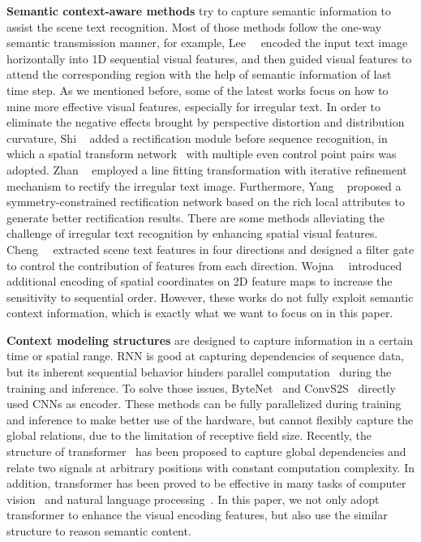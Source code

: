 \documentclass[10pt,twocolumn,letterpaper]{article}
\begin{document}
\begin{CJK}{UTF8}{gbsn}
\textbf{Semantic context-aware methods} try to capture semantic information to assist the scene text recognition. Most of those methods follow the one-way semantic transmission manner, for example, Lee~\etal~\cite{lee2016recursive} encoded the input text image horizontally into 1D sequential visual features, and then guided visual features to attend the corresponding region with the help of semantic information of last time step.
As we mentioned before, some of the latest works focus on how to mine more effective visual features, especially for irregular text. 
In order to eliminate the negative effects brought by perspective distortion and distribution curvature, Shi \etal~\cite{shi2018aster} added a rectification module before sequence recognition, in which a spatial transform network~\cite{jaderberg2015spatial} with multiple even control point pairs was adopted. 
Zhan \etal~\cite{zhan2019esir} employed a line fitting transformation with iterative refinement mechanism to rectify the irregular text image.
Furthermore, Yang \etal~\cite{yang2019symmetry} proposed a symmetry-constrained rectification network based on the rich local attributes to generate better rectification results.
There are some methods alleviating the challenge of irregular text recognition by enhancing spatial visual features. 
Cheng~\etal~\cite{cheng2018aon} extracted scene text features in four directions and designed a filter gate to control the contribution of features from each direction. 
Wojna~\etal~\cite{wojna2017attention-2D} introduced additional encoding of spatial coordinates on 2D feature maps to increase the sensitivity to sequential order.
However, these works do not fully exploit semantic context information, which is exactly what we want to focus on in this paper.

\textbf{Context modeling structures} are designed to capture information in a certain time or spatial range.
RNN is good at capturing dependencies of sequence data, but its inherent sequential behavior hinders parallel computation~\cite{wojna2017attention-2D} during the training and inference.
To solve those issues, ByteNet~\cite{kalchbrenner2016neural} and ConvS2S~\cite{gehring2017convolutional} directly used CNNs as encoder. These methods can be fully parallelized during training and inference to make better use of the hardware, but cannot flexibly capture the global relations, due to the limitation of receptive field size.
Recently, the structure of transformer~\cite{lin2017structured-selfattention} has been proposed to capture global dependencies and relate two signals at arbitrary positions with constant computation complexity. 
In addition, transformer has been proved to be effective in many tasks of computer vision~\cite{hu2018relation,wang2018non} and natural language processing~\cite{vaswani2017attention}.
In this paper, we not only adopt transformer to enhance the visual encoding features, but also use the similar structure to reason semantic content.

\end{CJK}
\end{document}
